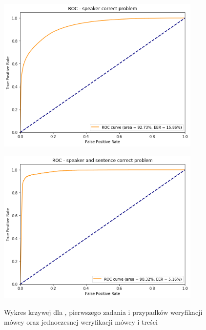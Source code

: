 \begin{figure}[H]
    \centering
    \begin{minipage}{.5\textwidth}
        \centering
        \includegraphics[width=0.9\textwidth]{images/4_3_hmm_roc_speaker}
        \label{fig:4_3_hmm_roc_speaker}
    \end{minipage}%
    \begin{minipage}{.5\textwidth}
        \centering
        \includegraphics[width=0.9\textwidth]{images/4_3_hmm_roc_both}
        \label{fig:4_3_hmm_roc_both}
    \end{minipage}
    \caption{Wykres krzywej  dla , pierwszego zadania  i przypadków weryfikacji mówcy oraz jednoczesnej weryfikacji mówcy i treści}
\end{figure}

